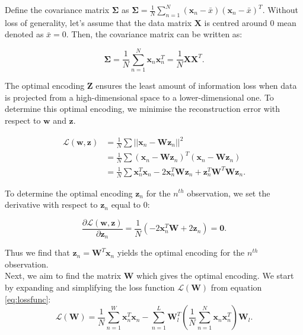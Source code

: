 \documentclass{article}\usepackage[]{graphicx}\usepackage[]{xcolor}
\numberwithin{equation}{section}
\begin{document}
{\noindent
Define the covariance matrix $\mathbf{\Sigma}$ as $\mathbf{\Sigma} = \frac{1}{N} \sum_{n=1}^N(\mathbf{x}_n-\bar{x})(\mathbf{x}_n-\bar{x})^T$. Without loss of generality, let's assume that the data matrix $\mathbf{X}$ is centred around $0$ mean denoted as $\bar{x} = 0$. Then, the covariance matrix can be written as:

\begin{equation}
\mathbf{\Sigma} = \frac{1}{N} \sum_{n=1}^N\mathbf{x}_n\mathbf{x}_n^T = \frac{1}{N} \mathbf{X}\mathbf{X}^T. \label{eq:cov}
\end{equation}

\noindent
The optimal encoding $\mathbf{Z}$ ensures the least amount of information loss when data is projected from a high-dimensional space to a lower-dimensional one. To determine this optimal encoding, we minimise the reconstruction error with respect to $\mathbf{w}$ and $\mathbf{z}$.

\begin{equation}
\begin{aligned}
\mathcal{L}(\mathbf{w},\mathbf{z}) &= \frac{1}{N}\sum ||\mathbf{x}_n - \mathbf{W}\mathbf{z}_n||^2  \\
&= \frac{1}{N}\sum (\mathbf{x}_n - \mathbf{W}\mathbf{z}_n)^T(\mathbf{x}_n - \mathbf{W}\mathbf{z}_n)  \\
&= \frac{1}{N}\sum \mathbf{x}_n^T\mathbf{x}_n - 2\mathbf{x}_n^T\mathbf{W}\mathbf{z}_n+\mathbf{z}_n^T\mathbf{W}^T\mathbf{W}\mathbf{z}_n . \label{eq:lossfunc}
\end{aligned}
\end{equation}

\noindent
To determine the optimal encoding $\mathbf{z}_n$ for the $n^{th}$ observation, we set the derivative with respect to $\mathbf{z}_n $ equal to $0$:

$$\frac{\partial \mathcal{L}(\mathbf{w},\mathbf{z})}{\partial \mathbf{z}_n} = \frac{1}{N} (-2 \mathbf{x}_n^T\mathbf{W} + 2\mathbf{z}_n)= \mathbf{0}.$$

\noindent
Thus we find that $\mathbf{z}_n = \mathbf{W}^T\mathbf{x}_n$ yields the optimal encoding for the $n^{th}$ observation.\\

\noindent
Next, we aim to find the matrix $\mathbf{W}$ which gives the optimal encoding. We start by expanding and simplifying the loss function $\mathcal{L}(\mathbf{W})$ from equation \ref{eq:lossfunc}: \\

\begin{equation}
\mathcal{L}(\mathbf{W}) = \frac{1}{N} \sum_{n=1}^{W}\mathbf{x}_n^T\mathbf{x}_n - \sum_{n=1}^{L}\mathbf{W}_l^T(\frac{1}{N} \sum_{n=1}^{N}\mathbf{x}_n\mathbf{x}_n^T)\mathbf{W}_l.
\end{equation}

}
\end{document}
